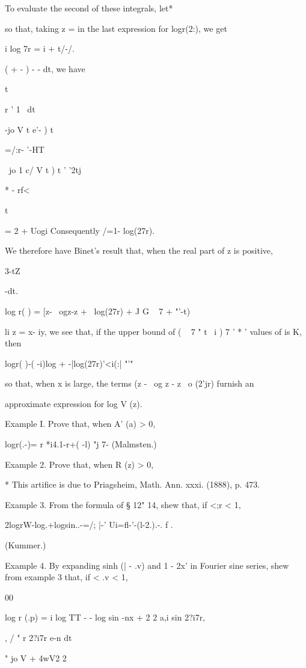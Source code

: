 %
%

To evaluate the second of these integrals, let*

so that, taking z = in the last expression for logr(2:), we get

i log 7r = i + t/-/.

( + - ) - - dt, we have

t

r ' 1 \ dt

-jo V t e'- ) t 

=/:r- '-HT

~jo 1 c/ V t ) t ' '2tj

* - rf<

t

= 2 + Uogi Consequently /=1- log(27r).

We therefore have Binet's result that, when the real part of z is
positive,

3-tZ

 -dt.

log r( ) = [z- \ ogz-z + \ log(27r) + J G ~ 7 + "'-t)

li z = x- iy, we see that, if the upper bound of ( ~ 7 " t \ i ) 7 ' *
' values of is K, then

logr( )-( -i)log + -|log(27r)'<i(:| "'"

so that, when x is large, the terms (z - \ og z - z \ o (2'jr) furnish
an

approximate expression for log V (z).

Example I. Prove that, when A' (a) > 0,

logr(.-)= r *i4.1-r+( -l) "j 7- (Malmsten.)

Example 2. Prove that, when R (z) > 0,

* This artifice is due to Priagsheim, Math. Ann. xxxi. (1888), p. 473.

%
%

Example 3. From the formula of § 12" 14, shew that, if <;r < 1,

2logrW-log.+logsin..-=/; |-' Ui=fl-'-(l-2.).-. f .

(Kummer.)

Example 4. By expanding sinh (| - .v) and 1 - 2x' in Fourier sine
series, shew from example 3 that, if < .v < 1,

00

log r (.p) = i log TT - - log sin -nx + 2 2 a,i sin 2?i7r,

, / " r 2?i7r e-n dt

" jo V + 4wV2 2%

